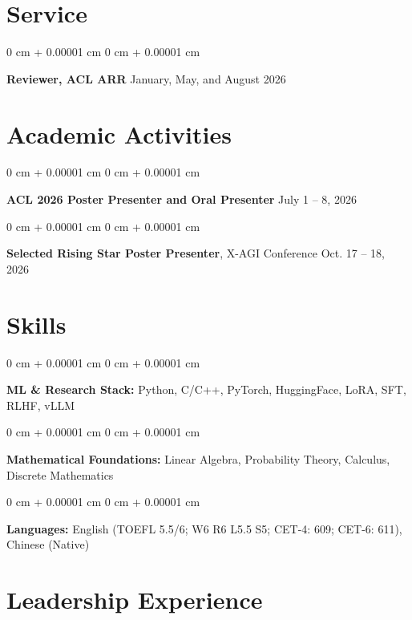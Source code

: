 \documentclass[10pt, letterpaper]{article}
\newenvironment{onecolentry}{
    \begin{adjustwidth}{
        0 cm + 0.00001 cm
    }{
        0 cm + 0.00001 cm
    }
}{
\end{adjustwidth}
} %
\begin{document}
\vspace{0.12cm}
\newpage
\section{Service}

\begin{onecolentry}
\textbf{Reviewer, ACL ARR} \hfill January, May, and August 2026
\end{onecolentry}

\section{Academic Activities}

\begin{onecolentry}
\textbf{ACL 2026 Poster Presenter and Oral Presenter} \hfill July 1 -- 8, 2026
\end{onecolentry}

\begin{onecolentry}
\textbf{Selected Rising Star Poster Presenter}, X-AGI Conference \hfill Oct. 17 -- 18, 2026
\end{onecolentry}

\section{Skills}

\begin{onecolentry}
\textbf{ML \& Research Stack:} Python, C/C++, PyTorch, HuggingFace, LoRA, SFT, RLHF, vLLM
\end{onecolentry}

\vspace{0.15 cm}

\begin{onecolentry}
\textbf{Mathematical Foundations:} Linear Algebra, Probability Theory, Calculus, Discrete Mathematics
\end{onecolentry}

\vspace{0.15 cm}

\begin{onecolentry}
\textbf{Languages:} English (TOEFL 5.5/6; W6 R6 L5.5 S5; CET-4: 609; CET-6: 611), Chinese (Native)
\end{onecolentry}

\section{Leadership Experience}
\end{document}
